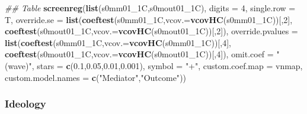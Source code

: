 \documentclass[
]{article}
\newenvironment{Shaded}{\begin{snugshade}}{\end{snugshade}}
\newcommand{\CommentTok}[1]{\textcolor[rgb]{0.56,0.35,0.01}{\textit{#1}}}
\newcommand{\DataTypeTok}[1]{\textcolor[rgb]{0.13,0.29,0.53}{#1}}
\newcommand{\DecValTok}[1]{\textcolor[rgb]{0.00,0.00,0.81}{#1}}
\newcommand{\FloatTok}[1]{\textcolor[rgb]{0.00,0.00,0.81}{#1}}
\newcommand{\KeywordTok}[1]{\textcolor[rgb]{0.13,0.29,0.53}{\textbf{#1}}}
\newcommand{\NormalTok}[1]{#1}
\newcommand{\StringTok}[1]{\textcolor[rgb]{0.31,0.60,0.02}{#1}}
\begin{document}
\begin{Shaded}
\begin{Highlighting}[]
\CommentTok{## Table}
\KeywordTok{screenreg}\NormalTok{(}\KeywordTok{list}\NormalTok{(s0mm01_1C,s0mout01_1C), }\DataTypeTok{digits =} \DecValTok{4}\NormalTok{, }\DataTypeTok{single.row =}\NormalTok{ T,}
          \DataTypeTok{override.se =} \KeywordTok{list}\NormalTok{(}\KeywordTok{coeftest}\NormalTok{(s0mm01_1C,}\DataTypeTok{vcov.=}\KeywordTok{vcovHC}\NormalTok{(s0mm01_1C))[,}\DecValTok{2}\NormalTok{],}
                             \KeywordTok{coeftest}\NormalTok{(s0mout01_1C,}\DataTypeTok{vcov.=}\KeywordTok{vcovHC}\NormalTok{(s0mout01_1C))[,}\DecValTok{2}\NormalTok{]),}
          \DataTypeTok{override.pvalues =} \KeywordTok{list}\NormalTok{(}\KeywordTok{coeftest}\NormalTok{(s0mm01_1C,}\DataTypeTok{vcov.=}\KeywordTok{vcovHC}\NormalTok{(s0mm01_1C))[,}\DecValTok{4}\NormalTok{],}
                                  \KeywordTok{coeftest}\NormalTok{(s0mout01_1C,}\DataTypeTok{vcov.=}\KeywordTok{vcovHC}\NormalTok{(s0mout01_1C))[,}\DecValTok{4}\NormalTok{]),}
          \DataTypeTok{omit.coef =} \StringTok{"(wave)"}\NormalTok{, }\DataTypeTok{stars =} \KeywordTok{c}\NormalTok{(}\FloatTok{0.1}\NormalTok{,}\FloatTok{0.05}\NormalTok{,}\FloatTok{0.01}\NormalTok{,}\FloatTok{0.001}\NormalTok{), }\DataTypeTok{symbol =} \StringTok{"+"}\NormalTok{,}
          \DataTypeTok{custom.coef.map =}\NormalTok{ vnmap, }
          \DataTypeTok{custom.model.names =} \KeywordTok{c}\NormalTok{(}\StringTok{"Mediator"}\NormalTok{,}\StringTok{"Outcome"}\NormalTok{))}
\end{Highlighting}
\end{Shaded}

\hypertarget{ideology}{%
\subsubsection{Ideology}\label{ideology}}
\end{document}
